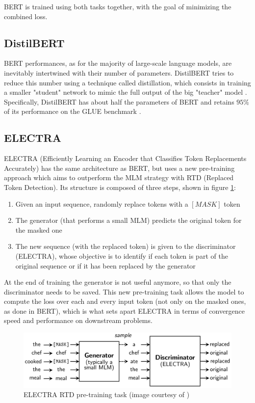 \documentclass[a4paper,10pt]{report}
\begin{document}
BERT is trained using both tasks together, with the goal of minimizing the combined loss.

\subsection{DistilBERT}\label{subsec:distilbert-model}
BERT performances, as for the majority of large-scale language models, are inevitably intertwined with their number of parameters. DistilBERT \cite{distilbert,distilbert-article} tries to reduce this number using a technique called distillation, which consists in training a smaller "student" network to mimic the full output of the big "teacher" model \cite{distillation}. Specifically, DistilBERT has about half the parameters of BERT and retains $95\%$ of its performance on the GLUE benchmark \cite{glue}.

\subsection{ELECTRA}\label{subsec:electra-model}
ELECTRA (Efficiently Learning an Encoder that Classifies Token Replacements Accurately) \cite{electra} has the same architecture as BERT, but uses a new pre-training approach which aims to outperform the MLM strategy with RTD (Replaced Token Detection). Its structure is composed of three steps, shown in figure \ref{fig:electra}:
\begin{enumerate}
  \item Given an input sequence, randomly replace tokens with a $[MASK]$ token
  \item The generator (that performs a small MLM) predicts the original token for the masked one
  \item The new sequence (with the replaced token) is given to the discriminator (ELECTRA), whose objective is to identify if each token is part of the original sequence or if it has been replaced by the generator
\end{enumerate}
At the end of training the generator is not useful anymore, so that only the discriminator needs to be saved.
This new pre-training task allows the model to compute the loss over each and every input token (not only on the masked ones, as done in BERT), which is what sets apart ELECTRA in terms of convergence speed and performance on downstream problems.

\begin{figure}[h]
  \center
  \includegraphics[width=0.85\linewidth]{electra-pretraining}
  \caption{ELECTRA RTD pre-training task (image courtesy of \cite{electra})}
  \label{fig:electra}
\end{figure}
\end{document}
